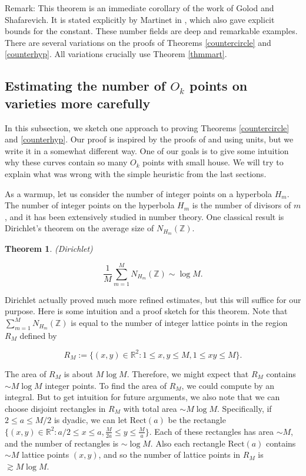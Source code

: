 \documentclass{amsart}
\newtheorem{theorem}[prop]{Theorem}
\newcommand{\ZZ}{\mathbb{Z}}
\newcommand{\RR}{\mathbb{R}}
\newcommand{\Rect}{\textrm{Rect}}
\begin{document}
Remark: This theorem is an immediate corollary of the work of Golod and Shafarevich.  It is stated explicitly by Martinet in \cite{Ma}, which also gave explicit bounds for the constant.
  These number fields are deep and remarkable examples.  There are several variations on the proofs of Theorems \ref{countercircle} and \ref{counterhyp}.  All variations crucially use Theorem \ref{thmmart}. 
  


\subsection{Estimating the number of $O_k$ points on varieties more carefully} \label{subsecdir}

In this subsection,  we sketch one approach to proving Theorems \ref{countercircle} and \ref{counterhyp}.  Our proof is inspired by the proofs of \cite{BSSZ} and \cite{Anth} using units, but we write it in a somewhat different way.   One of our goals is to give some intuition why these curves contain so many $O_k$ points with small house.  We will try to explain what was wrong with the simple heuristic from the last sections.

As a warmup,  let us consider the number of integer points on a hyperbola $H_m$.    The number of integer points on the hyperbola $H_m$ is the number of divisors of $m$,  and it has been extensively studied in number theory.   One classical result is Dirichlet's theorem on the average size of $N_{H_m}(\ZZ)$.   

\begin{theorem} (Dirichlet) 

$$ \frac{1}{M} \sum_{m=1}^M N_{H_m}(\ZZ) \sim \log M. $$

\end{theorem}

Dirichlet actually proved much more refined estimates,  but this will suffice for our purpose.    Here is some intuition and a proof sketch for this theorem.  Note that $\sum_{m=1}^M N_{H_m}(\ZZ)$ is equal to the number of integer lattice points in the region $R_M$ defined by

$$ R_M := \{ (x,y) \in \RR^2: 1 \le x,y \le M,  1 \le xy \le M \}. $$

\noindent The area of $R_M$ is about $M \log M$.   Therefore,  we might expect that $R_M$ contains $\sim M \log M$ integer points.  To find the area of $R_M$, we could compute by an integral.  But to get intuition for future arguments, we also note that we can choose disjoint rectangles in $R_M$ with total area $\sim M \log M$.  Specifically, if $2 \le a \le M/2$ is dyadic, we can let $\Rect(a)$ be the rectangle $\{ (x,y) \in \RR^2: a/2 \le x \le a, \frac{M}{2a} \le y \le \frac{M}{a} \}$.  Each of these rectangles has area $\sim M$, and the number of rectangles is $\sim \log M$.  Also each rectangle $\Rect(a)$ contains $\sim M$ lattice points $(x,y)$, and so the number of lattice points in $R_M$ is $\gtrsim M \log M$. 
\end{document}
